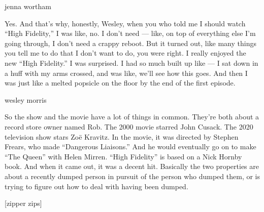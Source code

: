 jenna wortham

Yes. And that's why, honestly, Wesley, when you who told me I should
watch ``High Fidelity,'' I was like, no. I don't need --- like, on top
of everything else I'm going through, I don't need a crappy reboot. But
it turned out, like many things you tell me to do that I don't want to
do, you were right. I really enjoyed the new ``High Fidelity.'' I was
surprised. I had so much built up like --- I sat down in a huff with my
arms crossed, and was like, we'll see how this goes. And then I was just
like a melted popsicle on the floor by the end of the first episode.

wesley morris

So the show and the movie have a lot of things in common. They're both
about a record store owner named Rob. The 2000 movie starred John
Cusack. The 2020 television show stars Zoë Kravitz. In the movie, it was
directed by Stephen Frears, who made ``Dangerous Liaisons.'' And he
would eventually go on to make ``The Queen'' with Helen Mirren. ``High
Fidelity'' is based on a Nick Hornby book. And when it came out, it was
a decent hit. Basically the two properties are about a recently dumped
person in pursuit of the person who dumped them, or is trying to figure
out how to deal with having been dumped.

{[}zipper zips{]}

